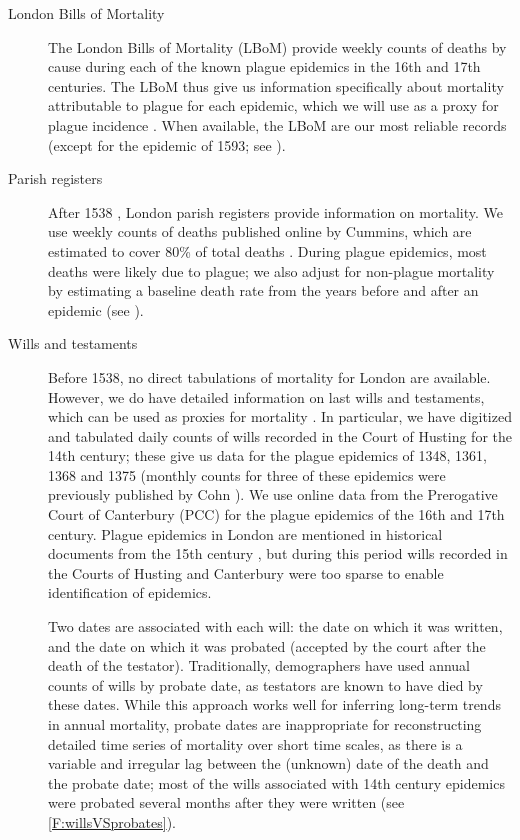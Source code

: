 \begin{description}
\item[London Bills of Mortality] The London Bills of Mortality \cite{Crei65,Tien+11} (LBoM) provide weekly counts of deaths by cause during each of the known plague epidemics in the 16th and 17th centuries.  The LBoM thus give us information specifically about mortality attributable to plague for each epidemic, which we will use as a proxy for plague incidence \cite{KermMcKe27,Ma+14}.  When available, the LBoM are our most reliable records (except for the epidemic of 1593; see \supp).
\item[Parish registers] After 1538 \cite[p.\,54]{Slac90}\cite{Wall04}, London parish registers provide information on mortality.
We use weekly counts of deaths published online by Cummins, which are estimated to cover 80\% of total deaths \cite{Cumm+16}. During plague epidemics, most deaths were likely due to plague; we also adjust for non-plague mortality by estimating a baseline death rate from the years before and after an epidemic (see \Methodslink).
\hypertarget{mainsec:Data.wills}{}
\item[Wills and testaments] Before 1538, no direct tabulations of mortality for London are available. However, we do have detailed information on last wills and testaments, which can be used as proxies for mortality \cite{Slac90}. In particular, we have digitized and tabulated daily counts of wills recorded in the Court of Husting \cite{Shar1889} for the 14th century; these give us data for the plague epidemics of 1348, 1361, 1368 and 1375 (monthly counts for three of these epidemics were previously published by Cohn \cite{Cohn03}). We use online data from the Prerogative Court of Canterbury (PCC) \cite{Archives2018} 
for the plague epidemics of the 16th and 17th century.  Plague epidemics in London are mentioned in historical documents from the 15th century \cite[Ch.\,IV]{Crei65}, but during this period wills recorded in the Courts of Husting and Canterbury were too sparse to enable identification of epidemics.

Two dates are associated with each will: the date on which it was written, and the date on which it was probated (\ie accepted by the court after the death of the testator). Traditionally, demographers have used annual counts of wills by probate date, as testators are known to have died by these dates. While this approach works well for inferring long-term trends in annual mortality, probate dates are inappropriate for reconstructing detailed time series of mortality over short time scales, as there is a variable and irregular lag between the (unknown) date of the death and the probate date; most of the wills associated with 14th century epidemics were probated several months after they were written \cite{Bush19} (see \cref{F:willsVSprobates}).
  

\end{description}
